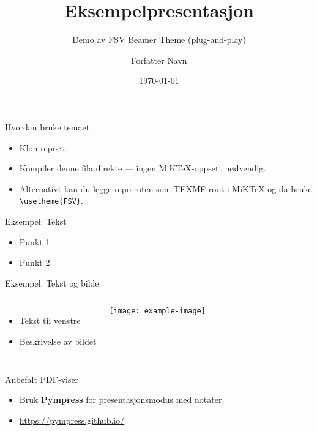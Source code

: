 \documentclass{beamer}
\title{Eksempelpresentasjon}
\subtitle{Demo av FSV Beamer Theme (plug-and-play)}
\author{Forfatter Navn}
\institute{Fagskolen Viken}
\date{\today}
\begin{document}
	
	\begin{frame}
		\titlepage
	\end{frame}
	
	\begin{frame}{Hvordan bruke temaet}
		\begin{itemize}
			\item Klon repoet.
			\item Kompiler denne fila direkte — ingen MiKTeX-oppsett nødvendig.
			\item Alternativt kan du legge repo-roten som TEXMF-root i MiKTeX og da bruke \texttt{\textbackslash usetheme\{FSV\}}.
		\end{itemize}
	\end{frame}

	
	\begin{frame}{Eksempel: Tekst}
		\begin{itemize}
			\item Punkt 1
			\item Punkt 2
		\end{itemize}
	\end{frame}
	
	\begin{frame}{Eksempel: Tekst og bilde}
		\begin{columns}
			\column{0.5\textwidth}
			\begin{itemize}
				\item Tekst til venstre
				\item Beskrivelse av bildet
			\end{itemize}
			\column{0.5\textwidth}
			\texttt{[image: example-image]}
		\end{columns}
	\end{frame}
	
	\begin{frame}{Anbefalt PDF-viser}
		\begin{itemize}
			\item Bruk \textbf{Pympress} for presentasjonsmodus med notater.
			\item \url{https://pympress.github.io/}
		\end{itemize}
	\end{frame}
	
\end{document}
